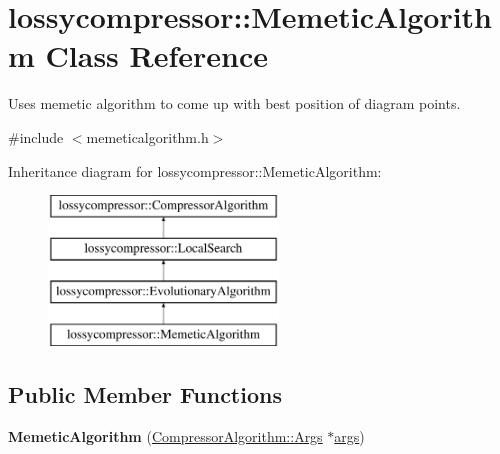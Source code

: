 \hypertarget{classlossycompressor_1_1_memetic_algorithm}{}\section{lossycompressor\+:\+:Memetic\+Algorithm Class Reference}
\label{classlossycompressor_1_1_memetic_algorithm}


Uses memetic algorithm to come up with best position of diagram points.  




{\ttfamily \#include $<$memeticalgorithm.\+h$>$}

Inheritance diagram for lossycompressor\+:\+:Memetic\+Algorithm\+:\begin{figure}[H]
\begin{center}
\leavevmode
\includegraphics[height=4.000000cm]{classlossycompressor_1_1_memetic_algorithm}
\end{center}
\end{figure}
\subsection*{Public Member Functions}
\begin{DoxyCompactItemize}
\item 
{\bfseries Memetic\+Algorithm} (\hyperlink{structlossycompressor_1_1_compressor_algorithm_1_1_args}{Compressor\+Algorithm\+::\+Args} $\ast$\hyperlink{classlossycompressor_1_1_compressor_algorithm_a7cec23bc2a41ac35617e21466a2f0c46}{args})\hypertarget{classlossycompressor_1_1_memetic_algorithm_a5cef9ea6d77bb7ec8f5864d39c2215cc}{}\label{classlossycompressor_1_1_memetic_algorithm_a5cef9ea6d77bb7ec8f5864d39c2215cc}

\end{DoxyCompactItemize}
